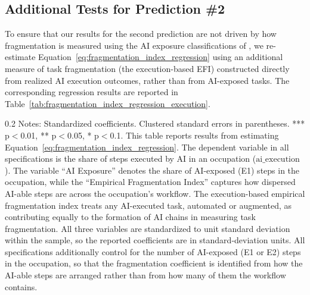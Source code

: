 \subsection{Additional Tests for Prediction \#2}
\label{app:additional_robustness_pred2}
To ensure that our results for the second prediction are not driven by how fragmentation is measured using the AI exposure classifications of \citet{eloundou2023gpts}, we re-estimate Equation~\eqref{eq:fragmentation_index_regression} using an additional measure of task fragmentation (the execution-based EFI) constructed directly from realized AI execution outcomes, rather than from AI-exposed tasks.
The corresponding regression results are reported in Table~\ref{tab:fragmentation_index_regression_execution}.

\begin{table}[!t]
    \caption{Role of AI-able Task Fragmentation in Determining AI Execution Outcomes (Execution-Based Empirical Fragmentation Measure)}
    \label{tab:fragmentation_index_regression_execution}
    \footnotesize
    \centering
    
    \begin{minipage}{1\linewidth}
\begin{spacing}{0.2}
{\fontsize{9.5pt}{10pt}\selectfont Notes: Standardized coefficients. Clustered standard errors in parentheses. *** p$<$0.01, ** p$<$0.05, * p$<$0.1.
This table reports results from estimating Equation~\eqref{eq:fragmentation_index_regression}.
The dependent variable in all specifications is the share of steps executed by AI in an occupation ($\text{ai\_execution}$).
The variable ``AI Exposure'' denotes the share of AI-exposed (E1) steps in the occupation, while the ``Empirical Fragmentation Index'' captures how dispersed AI-able steps are across the occupation's workflow.
The execution-based empirical fragmentation index treats any AI-executed task, automated or augmented, as contributing equally to the formation of AI chains in measuring task fragmentation.
All three variables are standardized to unit standard deviation within the sample, so the reported coefficients are in standard-deviation units. All specifications additionally control for the number of AI-exposed (E1 or E2) steps in the occupation, so that the fragmentation coefficient is identified from how the AI-able steps are arranged rather than from how many of them the workflow contains.}
\end{spacing}
\end{minipage}\end{table}

